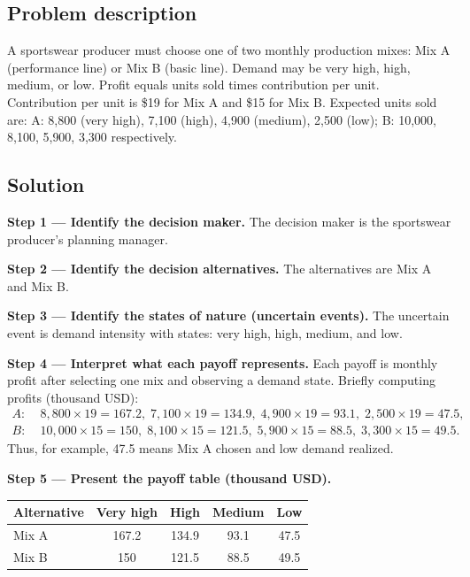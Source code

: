 \begin{ExamProblems}
		\item
		\subsection*{Problem description}
		A sportswear producer must choose one of two monthly production mixes:
		Mix A (performance line) or Mix B (basic line).
		Demand may be very high, high, medium, or low.
		Profit equals units sold times contribution per unit.
		Contribution per unit is \$19 for Mix A and \$15 for Mix B.
		Expected units sold are:
		A: 8{,}800 (very high), 7{,}100 (high), 4{,}900 (medium), 2{,}500 (low);
		B: 10{,}000, 8{,}100, 5{,}900, 3{,}300 respectively.
		
		\subsection*{Solution}
		\textbf{Step 1 --- Identify the decision maker.} The decision maker is the sportswear producer's planning manager.
		
		\textbf{Step 2 --- Identify the decision alternatives.} The alternatives are Mix A and Mix B.
		
		\textbf{Step 3 --- Identify the states of nature (uncertain events).} The uncertain event is demand intensity with states: very high, high, medium, and low.
		
		\textbf{Step 4 --- Interpret what each payoff represents.} Each payoff is monthly profit after selecting one mix and observing a demand state. Briefly computing profits (thousand USD):
		\[
		\begin{aligned}
		A:&\;8{,}800\times19=167.2,\;7{,}100\times19=134.9,\;4{,}900\times19=93.1,\;2{,}500\times19=47.5,\\
		B:&\;10{,}000\times15=150,\;8{,}100\times15=121.5,\;5{,}900\times15=88.5,\;3{,}300\times15=49.5.
		\end{aligned}
		\]
		Thus, for example, 47.5 means Mix A chosen and low demand realized.
		
		\textbf{Step 5 --- Present the payoff table (thousand USD).}
		\begin{center}
			\begin{tabular}{l c c c c}
				\toprule
				Alternative & Very high & High & Medium & Low \\
				\midrule
				Mix A & 167.2 & 134.9 & 93.1 & 47.5 \\
				Mix B & 150 & 121.5 & 88.5 & 49.5 \\
				\bottomrule
			\end{tabular}
		\end{center}
		

\end{ExamProblems}
